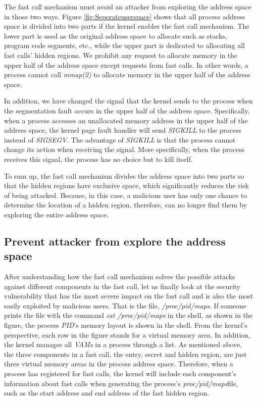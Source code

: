 The fast call mechanism must avoid an attacker from 
exploring the address space in those two ways. Figure 
\ref{fig:Seperateuserspace} shows that all process address space is divided into 
two parts if the kernel enables the fast call mechanism. 
The lower part is used as the original address space to 
allocate such as stacks, program code segments, etc., 
while the upper part is dedicated to allocating all 
fast calls' hidden regions.  We prohibit any request 
to allocate memory in the upper half of the address 
space except requests from fast calls. In other words, 
a process cannot call \emph{mmap(2)} to allocate memory in the 
upper half of the address space.

In addition, we have changed the signal that the kernel 
sends to the process when the segmentation fault occurs 
in the upper half of the address space. Specifically, 
when a process accesses an unallocated memory address 
in the upper half of the address space, the kernel page 
fault handler will send \emph{SIGKILL} to the process instead 
of \emph{SIGSEGV}. The advantage of \emph{SIGKILL} is that the process 
cannot change its action when receiving the signal. 
More specifically, when the process receives this signal, 
the process has no choice but to kill itself.

To sum up, the fast call mechanism divides the address 
space into two parts so that the hidden regions have 
exclusive space, which significantly reduces the risk 
of being attacked. Because, in this case, a malicious 
user has only one chance to determine the location of 
a hidden region, therefore, can no longer find them by
 exploring the entire address space.


\subsection{Prevent attacker from explore the address space}
After understanding how the fast call mechanism solves the 
possible attacks against different components in the fast call, 
let us finally look at the security vulnerability that has the most 
severe impact on the fast call and is also the most easily exploited 
by malicious users. That is the file, \emph{/proc/pid/maps}.
If someone prints the file with the command \emph{cat /proc/pid/maps} in the shell, 
as shown in the figure, the process \emph{PID}'s memory layout is shown in the shell. 
From the kernel's perspective, each row in the figure stands for a virtual 
memory area. In addition, the kernel manages all \emph{VAMs} in a process through a list. 
As mentioned above, the three components in a fast call, the entry, secret and hidden region, are just 
three virtual memory areas in the process address space. Therefore, when 
a process has registered for fast calls, the kernel will include each 
component's information about fast calls when generating the process's 
\emph{proc/pid/maps}file, such as the start address and end address of the fast 
hidden region.


